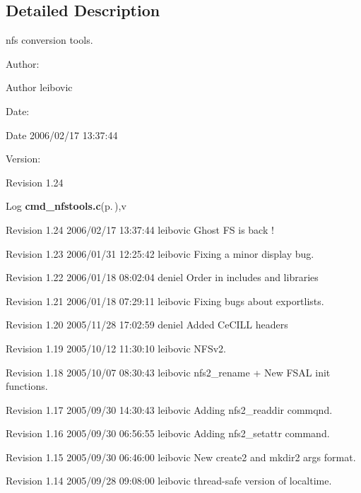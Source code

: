 \subsection{Detailed Description}
nfs conversion tools. 

\begin{Desc}
\item[Author:]\begin{Desc}
\item[Author]leibovic \end{Desc}
\end{Desc}
\begin{Desc}
\item[Date:]\begin{Desc}
\item[Date]2006/02/17 13:37:44 \end{Desc}
\end{Desc}
\begin{Desc}
\item[Version:]\begin{Desc}
\item[Revision]1.24 \end{Desc}
\end{Desc}
\begin{Desc}
\item[Log]{\bf cmd\_\-nfstools.c}{\rm (p.\,\pageref{cmd__nfstools_8c})},v \end{Desc}
Revision 1.24 2006/02/17 13:37:44 leibovic Ghost FS is back !

Revision 1.23 2006/01/31 12:25:42 leibovic Fixing a minor display bug.

Revision 1.22 2006/01/18 08:02:04 deniel Order in includes and libraries

Revision 1.21 2006/01/18 07:29:11 leibovic Fixing bugs about exportlists.

Revision 1.20 2005/11/28 17:02:59 deniel Added Ce\-CILL headers

Revision 1.19 2005/10/12 11:30:10 leibovic NFSv2.

Revision 1.18 2005/10/07 08:30:43 leibovic nfs2\_\-rename + New FSAL init functions.

Revision 1.17 2005/09/30 14:30:43 leibovic Adding nfs2\_\-readdir commqnd.

Revision 1.16 2005/09/30 06:56:55 leibovic Adding nfs2\_\-setattr command.

Revision 1.15 2005/09/30 06:46:00 leibovic New create2 and mkdir2 args format.

Revision 1.14 2005/09/28 09:08:00 leibovic thread-safe version of localtime.

